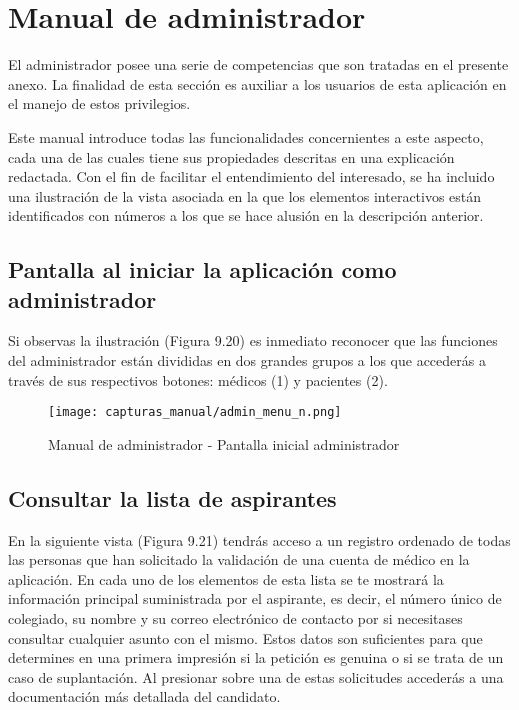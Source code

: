 \documentclass[11pt,spanish,
		listoftables,listoffigures]
		{tfgplantilla}
\begin{document}
\section{Manual de administrador}

El administrador posee una serie de competencias que son tratadas en el presente anexo. La finalidad de esta sección es auxiliar a los usuarios de esta aplicación en el manejo de estos privilegios. 

Este manual introduce todas las funcionalidades concernientes a este aspecto, cada una de las cuales tiene sus propiedades descritas en una explicación redactada. Con el fin de facilitar el entendimiento del interesado, se ha incluido una ilustración de la vista asociada en la que los elementos interactivos están identificados con números a los que se hace alusión en la descripción anterior.
 
\subsection {Pantalla al iniciar la aplicación como administrador}

Si observas la ilustración (Figura 9.20) es inmediato reconocer que las funciones del administrador están divididas en dos grandes grupos a los que accederás a través de sus respectivos botones: médicos (1) y pacientes (2).

\begin{figure}[H]
\centering
\texttt{[image: capturas\_manual/admin\_menu\_n.png]}
\caption{Manual de administrador - Pantalla inicial administrador}
\end{figure}

\newpage
\subsection {Consultar la lista de aspirantes}

En la siguiente vista (Figura 9.21) tendrás acceso a un registro ordenado de todas las personas que han solicitado la validación de una cuenta de médico en la aplicación. En cada uno de los elementos de esta lista se te mostrará la información principal suministrada por el aspirante, es decir, el número único de colegiado, su nombre y su correo electrónico de contacto por si necesitases consultar cualquier asunto con el mismo. Estos datos son suficientes para que determines en una primera impresión si la petición es genuina o si se trata de un  caso de suplantación. Al presionar sobre una de estas solicitudes accederás a una documentación más detallada del candidato.
\end{document}
